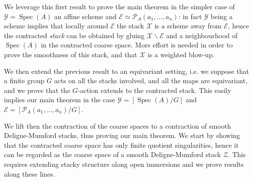 \documentclass{amsart}
\newcommand{\cE}{\mathcal{E}}
\newcommand{\cP}{\mathcal{P}}
\newcommand{\cU}{\mathcal{U}}
\newcommand{\cX}{\mathcal{X}}
\newcommand{\cY}{\mathcal{Y}}
\newcommand{\cZ}{\mathcal{Z}}
\newcommand{\spec}{\operatorname{Spec}}
\newtheorem{Teo}[theorem]{Theorem}
\theoremstyle{definition}
\begin{document}
We leverage this first result to prove the main theorem in the simpler case of $\cY=\spec(A)$ an affine scheme and $\cE\simeq \cP_A(a_1,\ldots,a_n)$: in fact $\cY$ being a scheme implies that locally around $\cE$ the stack $\cX$ is a scheme away from $\cE$, hence the contracted \emph{stack} can be obtained by gluing $\cX\smallsetminus\cE$ and a neighbourhood of $\spec(A)$ in the contracted coarse space. More effort is needed in order to prove the smoothness of this stack, and that $\cX$ is a weighted blow-up.

We then extend the previous result to an equivariant setting, i.e. we suppose that a finite group $G$ acts on all the stacks involved, and all the maps are equivariant, and we prove that the $G$-action extends to the contracted stack. This easily implies our main theorem in the case $\cY=[\spec(A)/G]$ and $\cE=[\cP_A(a_1,\ldots,a_n)/G]$. 

We lift then the contraction of the coarse spaces to a contraction of smooth Deligne-Mumford stacks, thus proving our main theorem. We start by showing that the contracted coarse space has only finite quotient singularities, hence it can be regarded as the coarse space of a smooth Deligne-Mumford stack $\cZ$. This requires extending stacky structure along open immersions and we prove results along these lines.
\end{document}
